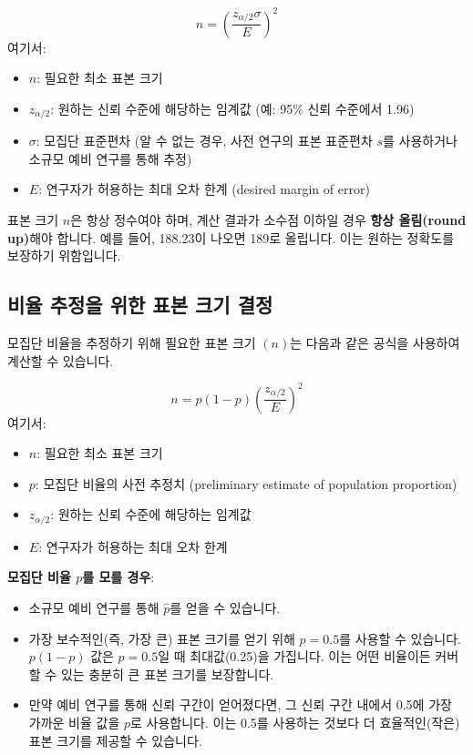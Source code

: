 \documentclass[11pt,a4paper]{book}
\theoremstyle{definition}
\begin{document}
\begin{enumerate}
\begin{enumerate}
\begin{equation*}
    n = \left( \frac{z_{\alpha/2} \sigma}{E} \right)^2
\end{equation*}
여기서:
\begin{itemize}
    \item \(n\): 필요한 최소 표본 크기
    \item \(z_{\alpha/2}\): 원하는 신뢰 수준에 해당하는 임계값 (예: 95\% 신뢰 수준에서 1.96)
    \item \(\sigma\): 모집단 표준편차 (알 수 없는 경우, 사전 연구의 표본 표준편차 \(s\)를 사용하거나 소규모 예비 연구를 통해 추정)
    \item \(E\): 연구자가 허용하는 최대 오차 한계 (desired margin of error)
\end{itemize}

\begin{cautionbox}
    표본 크기 \(n\)은 항상 정수여야 하며, 계산 결과가 소수점 이하일 경우 \textbf{항상 올림(round up)}해야 합니다. 예를 들어, 188.23이 나오면 189로 올립니다. 이는 원하는 정확도를 보장하기 위함입니다.
\end{cautionbox}

\subsection{비율 추정을 위한 표본 크기 결정}
모집단 비율을 추정하기 위해 필요한 표본 크기 \((n)\)는 다음과 같은 공식을 사용하여 계산할 수 있습니다.

\begin{equation*}
    n = p(1-p) \left( \frac{z_{\alpha/2}}{E} \right)^2
\end{equation*}
여기서:
\begin{itemize}
    \item \(n\): 필요한 최소 표본 크기
    \item \(p\): 모집단 비율의 사전 추정치 (preliminary estimate of population proportion)
    \item \(z_{\alpha/2}\): 원하는 신뢰 수준에 해당하는 임계값
    \item \(E\): 연구자가 허용하는 최대 오차 한계
\end{itemize}

\begin{tipbox}
    \textbf{모집단 비율 \(p\)를 모를 경우}:
    \begin{itemize}
        \item 소규모 예비 연구를 통해 \(\hat{p}\)를 얻을 수 있습니다.
        \item 가장 보수적인(즉, 가장 큰) 표본 크기를 얻기 위해 \(p = 0.5\)를 사용할 수 있습니다. \(p(1-p)\) 값은 \(p=0.5\)일 때 최대값(0.25)을 가집니다. 이는 어떤 비율이든 커버할 수 있는 충분히 큰 표본 크기를 보장합니다.
        \item 만약 예비 연구를 통해 신뢰 구간이 얻어졌다면, 그 신뢰 구간 내에서 0.5에 가장 가까운 비율 값을 \(p\)로 사용합니다. 이는 0.5를 사용하는 것보다 더 효율적인(작은) 표본 크기를 제공할 수 있습니다.
    \end{itemize}
\end{tipbox}


\end{enumerate}
\end{enumerate}
\end{document}
